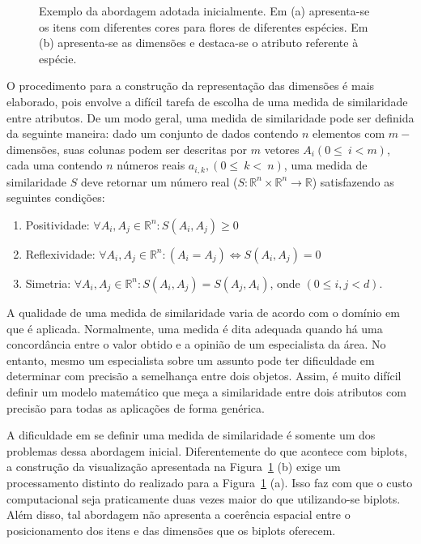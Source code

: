 \begin{figure}[h!]
\begin{subfigure}[b]{0.45\textwidth}
\begin{framed}
        \end{framed}
        \caption{}
    \end{subfigure} 
    \caption{Exemplo da abordagem adotada inicialmente. Em
        (a) apresenta-se os itens com diferentes cores para
        flores de diferentes espécies. Em (b) apresenta-se
        as dimensões e destaca-se o atributo referente à
        espécie.}
    \label{fig:dual}
\end{figure}

O procedimento para a construção da representação das
dimensões é mais elaborado, pois envolve a difícil tarefa de
escolha de uma medida de similaridade entre atributos. De um
modo geral, uma medida de similaridade pode ser definida da
seguinte maneira: dado um conjunto de dados contendo $n$
elementos com $m-$dimensões, suas colunas podem ser
descritas por $m$ vetores $A_i(0\leq~i<m)$, cada uma
contendo $n$ números reais $a_{i,k},(0\leq~k<~n)$, uma
medida de similaridade $S$ deve retornar um número real
($S:\mathbb{R}^n\times \mathbb{R}^n\rightarrow\mathbb{R}$)
satisfazendo as seguintes condições:

\begin{enumerate}

    \item Positividade: $\forall A_i,A_j \in \mathbb{R}^n:
        S(A_i,A_j) \geq 0 $

    \item Reflexividade: $\forall A_i,A_j \in
        \mathbb{R}^n: (A_i = A_j) \Leftrightarrow
        S(A_i,A_j) = 0 $

    \item Simetria: $\forall A_i,A_j \in
        \mathbb{R}^n: S(A_i,A_j) =
        S(A_j,A_i)$, onde $(0 \leq i,j <
        d)$.

\end{enumerate}

A qualidade de uma medida de similaridade varia de
acordo com o domínio em que é aplicada. Normalmente, uma
medida é dita adequada quando há uma concordância entre o
valor obtido e a opinião de um especialista da área. No
entanto, mesmo um especialista sobre um assunto pode ter
dificuldade em determinar com precisão a semelhança entre
dois objetos. Assim, é muito difícil definir um modelo
matemático que meça a similaridade entre dois atributos com
precisão para todas as aplicações de forma genérica. 

A dificuldade em se definir uma medida de similaridade é
somente um dos problemas dessa abordagem inicial.
Diferentemente do que acontece com biplots, a construção da
visualização apresentada na Figura~\ref{fig:dual} (b) exige
um processamento distinto do realizado para a
Figura~\ref{fig:dual} (a). Isso faz com que o custo
computacional seja praticamente duas vezes maior do que
utilizando-se biplots. Além disso, tal abordagem não
apresenta a coerência espacial entre o posicionamento dos
itens e das dimensões que os biplots oferecem.

